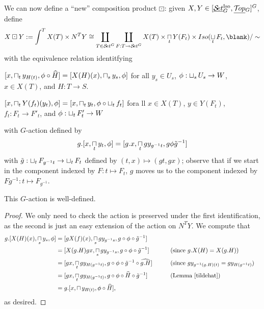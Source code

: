 \documentclass{report}
\renewenvironment{enumerate}%
{\begin{list}{\arabic{enumi}.}%
    {\itemsep=0in\usecounter{enumi}}%
  }{\end{list}}
\newcommand{\Top}{\text{$\mathcal{T}\!op$}}
\newcommand{\Set}{\text{$\mathcal{S}\!et$}}
\newcommand{\TopG}{\text{\underline{$\Top$}$_G$}}
\newcommand{\SetG}{\text{\underline{$\Set$}$_G^{\mbox{\scriptsize Iso}}$}}
\renewcommand{\ST}{\text{$[\SetG,\TopG]^G$}}
\newcommand{\icap}{\operatornamewithlimits{\sqcap}}
\newcommand{\ico}{\operatornamewithlimits{\sqcup}}
\renewcommand{\hat}[1]{\text{$\widehat{#1}$}}
\begin{document}
We can now define a ``new'' composition product $\boxdot$: given $X,Y\in\ST$, define
\[X\boxdot Y := \int^TX(T)\times N^TY \cong \coprod_{T\in\Set^G}\coprod_{F:T\to\Set^G}X(T)\times \icap_tY(F_t)\times Iso(\ico_tF_t,\blank)/\sim\]
with the equivalence relation identitfying
\begin{enumerate}
\item $[x,\icap_ty_{H(t)}, \phi\circ \hat H] = [X(H)(x),\icap_sy_s,\phi]$ for all $y_s\in U_s$, $\phi: \ico_sU_s\to W$, $x\in X(T)$, and $H: T\to S$. 
\item $[x,\icap_tY(f_t)(y_t),\phi] = [x,\icap_ty_t,\phi\circ \ico_t f_t]$ fora ll $x\in X(T)$, $y\in Y(F_t)$, $f_t: F_t\to F'_t$, and $\phi: \ico_tF'_t \to W$
\end{enumerate}
with $G$-action defined by
\[g.[x,\icap_ty_t, \phi] = [g.x, \icap_tgy_{g^{-1}t},g\phi\tilde g^{-1}]\]
with $\tilde g: \ico_tF_{g^{-1}t} \to \ico_tF_t$ defined by $(t,x)\mapsto (gt,gx)$; observe that if we start in the component indexed by $F: t\mapsto F_t$, $g$ moves us to the component indexed by $Fg^{-1}: t\mapsto F_{g^{-1}}$.

\begin{claim}
  This $G$-action is well-defined.
\end{claim}
\begin{proof}
  We only need to check the action is preserved under the first identification, as the second is just an easy extension of the action on $N^TY$. We compute that
  \begin{align*}
    g.[X(H)(x),\icap_sy_s,\phi] &= [gX(f)(x),\icap_sgy_{g^{-1}s},g\circ\phi\circ \tilde g^{-1}]\\
    &= [X(g.H)gx, \icap_sgy_{g^{-1}s},g\circ\phi\circ \tilde g^{-1}]  &\qquad &\mbox{(since $g.X(H) = X(g.H)$)}\\
    &= [gx, \icap_tgy_{H(g^{-1}t)}, g\circ \phi\circ \tilde g^{-1} \circ \hat{g.H}] & &\mbox{(since $gy_{g^{-1}(g.H)(t)} = gy_{H(g^{-1}t)}$)}\\
    &= [gx,\icap_tgy_{H(g^{-1}t)},g\circ \phi\circ \widehat H \circ \tilde g^{-1}] & &\mbox{(Lemma \ref{tildehat})}\\
    &= g.[x,\icap y_{H(t)}, \phi\circ \hat H],
  \end{align*}
  as desired.
\end{proof}
\end{document}
